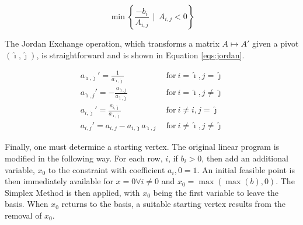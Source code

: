 \begin{equation}\label{eqs:ratio-min}
  \min \left\{ \frac{-b_i}{A_{i,j}} \:\: | \:\: A_{i,j} < 0 \right\}
\end{equation}

The Jordan Exchange operation, which transforms a matrix $A \mapsto A'$
given a pivot $(\hat{\imath}, \hat{\jmath})$, is straightforward and is shown in
Equation \ref{eqs:jordan}.

\begin{subequations}\label{eqs:jordan}
  \begin{align}
    a_{\hat{\imath},\hat{\jmath}}' = \frac{1}{a_{\hat{\imath},\hat{\jmath}}}
    &\:\: \text{for} \:
    i = \hat{\imath}, j = \hat{\jmath} \\
    a_{\hat{\imath},j}' = -\frac{a_{\hat{\imath},j}}{a_{\hat{\imath},\hat{\jmath}}}
    &\:\: \text{for} \:
    i = \hat{\imath}, j \neq \hat{\jmath} \\
    a_{i,\hat{\jmath}}' = \frac{a_{i,\hat{\jmath}}}{a_{\hat{\imath},\hat{\jmath}}}
    &\:\: \text{for} \:
    i \neq i, j = \hat{\jmath} \\
    a_{i,j}' = a_{i,j} - a_{i,\hat{\jmath}} a_{\hat{\imath},j}
    &\:\: \text{for} \:
    i \neq \hat{\imath}, j \neq \hat{\jmath}
  \end{align}
\end{subequations}

Finally, one must determine a starting vertex. The original linear program is
modified in the following way. For each row, $i$, if $b_i > 0$, then add an
additional variable, $x_0$ to the constraint with coefficient $a_i,0 = 1$. An
initial feasible point is then immediately available for $x = 0 \forall i \neq
0$ and $x_0 = \max(\max(b),0)$. The Simplex Method is then applied, with $x_0$
being the first variable to leave the basis. When $x_0$ returns to the basis, a
suitable starting vertex results from the removal of $x_0$.
